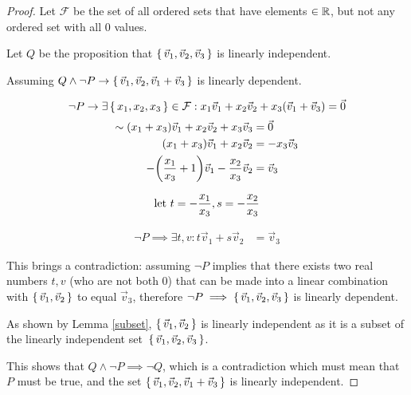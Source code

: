 \begin{proof}

	Let $\mathcal F$ be the set of all ordered sets that have elements $\in {\mathbb R}$, but not any ordered set with all 0 values.

	Let $Q$ be the proposition that $\set{\vec v_1, \vec v_2, \vec v_3}$ is linearly independent.

	Assuming $Q \wedge \neg P \rightarrow \set{\vec v_1, \vec v_2, \vec v_1 + \vec v_3}$ is linearly dependent.

	$$
		\neg P \rightarrow \exists \set{x_1,x_2,x_3} \in \mathcal F : x_1 \vec v_1 + x_2 \vec v_2 + x_3 { \left(\vec v_1 + \vec v_3\right) } = \vec 0
	$$
	\begin{align*}
		\sim
		{ \left(x_1 + x_3\right) } {\vec v_1} + x_2 \vec v_2 + x_3 \vec v_3    & = \vec 0         \\
		{ \left(x_1+x_3\right) }\vec v_1 + x_2\vec v_2                         & = - x_3 \vec v_3 \\
		-{ \left(\frac{x_1}{x_3} + 1\right) }\vec v_1 -\frac{x_2}{x_3}\vec v_2 & = \vec v_3
	\end{align*}

	$$
		{\text{let } } t = -\frac{x_1}{x_3}, s=-\frac{x_2}{x_3}
	$$

	\begin{align*}
		\neg P \implies \exists t,v : t\vec v_1 + s \vec v_2 & = \vec v_3
	\end{align*}

	This brings a contradiction: assuming $\neg P$ implies that there exists two real numbers $t, v$ (who are not both $0$) that can be made into a linear combination with $\set{\vec v_1, \vec v_2}$ to equal $\vec v_3$, therefore $\neg P \implies \set{\vec v_1, \vec v_2, \vec v_3}$ is linearly dependent.

	As shown by Lemma \ref{subset}, $\set{\vec v_1, \vec v_2}$ is linearly independent as it is a subset of the linearly independent set~$\set{\vec v_1, \vec v_2, \vec v_3}$.

	This shows that $Q\wedge \neg P \implies \neg Q$, which is a contradiction which must mean that $P$ must be true, and the set $\set{\vec v_1,\vec v_2, \vec v_1+\vec v_3}$ is linearly independent.



\end{proof}
